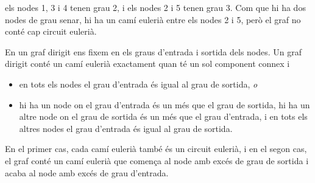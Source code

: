 els nodes 1, 3 i 4 tenen grau 2, i els nodes 2 i 5 tenen grau
3. Com que hi ha dos nodes de grau senar, hi ha un camí eulerià entre
els nodes 2 i 5, però el graf no conté cap circuit eulerià.

En un graf dirigit ens fixem en els graus d'entrada i sortida dels
nodes. Un graf dirigit conté un camí eulerià exactament quan té un sol
component connex i
\begin{itemize}
\item en tots els nodes el grau d'entrada és igual al grau de sortida, \emph{o}
\item hi ha un node on el grau d'entrada és un més que el grau de sortida,
  hi ha un altre node on el grau de sortida és un més que el grau d'entrada,
  i en tots els altres nodes el grau d'entrada és igual al grau de sortida.
\end{itemize}

En el primer cas, cada camí eulerià també és un circuit eulerià, i en
el segon cas, el graf conté un camí eulerià que comença al node amb excés
de grau de sortida i acaba al node amb excés de grau d'entrada.

